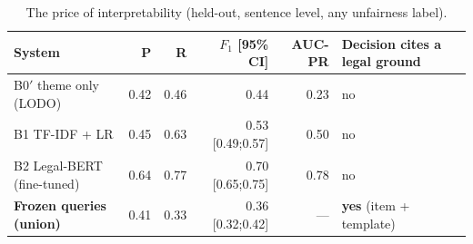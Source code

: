 \begin{table}[t]
\caption{The price of interpretability (held-out, sentence level, any unfairness label).}
\label{tab:cost}
\centering
\footnotesize\setlength{\tabcolsep}{4pt}
\begin{tabular}{@{}lrrrrl@{}}
\toprule
System & P & R & $F_1$ [95\% CI] & AUC-PR & Decision cites a legal ground \\
\midrule
B0$'$ theme only (LODO) & 0.42 & 0.46 & 0.44 & 0.23 & no \\
B1 TF-IDF + LR & 0.45 & 0.63 & 0.53 [0.49;0.57] & 0.50 & no \\
B2 Legal-BERT (fine-tuned) & 0.64 & 0.77 & 0.70 [0.65;0.75] & 0.78 & no \\
\textbf{Frozen queries (union)} & 0.41 & 0.33 & 0.36 [0.32;0.42] & --- & \textbf{yes} (item + template) \\
\bottomrule
\end{tabular}
\end{table}
